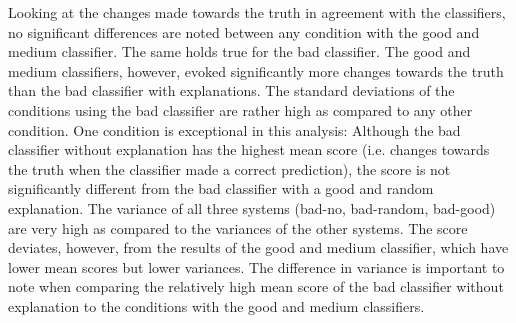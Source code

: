 \noindent Looking at the changes made towards the truth in agreement with the classifiers, no significant differences are noted between any condition with the good and medium classifier. The same holds true for the bad classifier. The good and medium classifiers, however, evoked significantly more changes towards the truth than the bad classifier with explanations. The standard deviations of the conditions using the bad classifier are rather high as compared to any other condition.\newline
One condition is exceptional in this analysis: Although the bad classifier without explanation has the highest mean score (i.e. changes towards the truth when the classifier made a correct prediction), the score is not significantly different from the bad classifier with a good and random explanation. The variance of all three systems (bad-no, bad-random, bad-good) are very high as compared to the variances of the other systems. The score deviates, however, from the results of the good and medium classifier, which have lower mean scores but lower variances. The difference in variance is important to note when comparing the relatively high mean score of the bad classifier without explanation to the conditions with the good and medium classifiers.

\begin{table}[H]
	\caption{Statistics for trust measure via proxy (changes towards truth and system decision)}
	\label{fig:results_table_proxy_towards}
\end{table}

